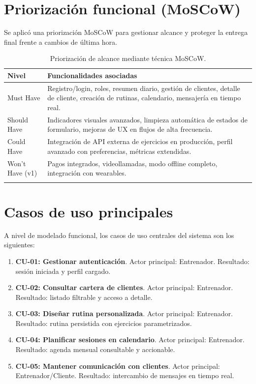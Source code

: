 \section{Priorización funcional (MoSCoW)}

Se aplicó una priorización MoSCoW para gestionar alcance y proteger la entrega final frente a cambios de última hora.

\begin{longtable}{@{}p{2cm}p{11.5cm}@{}}
\toprule
\textbf{Nivel} & \textbf{Funcionalidades asociadas} \\
\midrule
\endhead
Must Have & Registro/login, roles, resumen diario, gestión de clientes, detalle de cliente, creación de rutinas, calendario, mensajería en tiempo real. \\
Should Have & Indicadores visuales avanzados, limpieza automática de estados de formulario, mejoras de UX en flujos de alta frecuencia. \\
Could Have & Integración de API externa de ejercicios en producción, perfil avanzado con preferencias, métricas extendidas. \\
Won't Have (v1) & Pagos integrados, videollamadas, modo offline completo, integración con wearables. \\
\bottomrule
\caption{Priorización de alcance mediante técnica MoSCoW.}
\end{longtable}

\section{Casos de uso principales}

A nivel de modelado funcional, los casos de uso centrales del sistema son los siguientes:

\begin{enumerate}
  \item \textbf{CU-01: Gestionar autenticación}. Actor principal: Entrenador. Resultado: sesión iniciada y perfil cargado.
  \item \textbf{CU-02: Consultar cartera de clientes}. Actor principal: Entrenador. Resultado: listado filtrable y acceso a detalle.
  \item \textbf{CU-03: Diseñar rutina personalizada}. Actor principal: Entrenador. Resultado: rutina persistida con ejercicios parametrizados.
  \item \textbf{CU-04: Planificar sesiones en calendario}. Actor principal: Entrenador. Resultado: agenda mensual consultable y accionable.
  \item \textbf{CU-05: Mantener comunicación con clientes}. Actor principal: Entrenador/Cliente. Resultado: intercambio de mensajes en tiempo real.
\end{enumerate}

